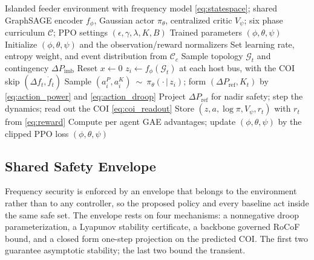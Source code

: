 \documentclass[lettersize,journal]{IEEEtran}
\begin{document}
	\begin{algorithm}[t]
		\caption{Topology-aware MAPPO training for FFR.}
		\label{alg:training}
		\begin{algorithmic}[1]
			\Require Islanded feeder environment with frequency model \eqref{eq:statespace}; shared GraphSAGE encoder $f_\phi$, Gaussian actor $\pi_\theta$, centralized critic $V_\psi$; six phase curriculum $\mathcal{C}$; PPO settings $(\epsilon,\gamma,\lambda,K,B)$
			\Ensure Trained parameters $(\phi,\theta,\psi)$
			\State Initialize $(\phi,\theta,\psi)$ and the observation/reward normalizers
			\State Set learning rate, entropy weight, and event distribution from $\mathcal{C}_c$
			\State Sample topology $\mathcal{G}_t$ and contingency $\Delta P_{\mathrm{imb}}$
			\State Reset $x\!\leftarrow\!0$
			\State $z_i \leftarrow f_\phi(\mathcal{G}_t)$ at each host bus, with the COI skip $(\Delta f_t,\dot f_t)$
			\State Sample $(a^P_i,a^K_i)~\sim~\pi_\theta(\cdot\,|\,z_i)$; form $(\Delta P_{\mathrm{ref}},K_t)$ by \eqref{eq:action_power} and \eqref{eq:action_droop}
			\State Project $\Delta P_{\mathrm{ref}}$ for nadir safety; step the dynamics; read out the COI \eqref{eq:coi_readout}
			\State Store $(z,a,\log\pi,V_\psi,r_t)$ with $r_t$ from \eqref{eq:reward}
			\EndFor
			\State Compute per agent GAE advantages; update $(\phi,\theta,\psi)$ by the clipped PPO loss
			\EndFor
			\EndFor
			\State \Return $(\phi,\theta,\psi)$
		\end{algorithmic}
	\end{algorithm}
	
	
	\subsection{Shared Safety Envelope}
	\label{sec:method:safety}
	
	Frequency security is enforced by an envelope that belongs to the environment rather than to any controller, so the proposed policy and every baseline act inside the same safe set. The envelope rests on four mechanisms: a nonnegative droop parameterization, a Lyapunov stability certificate, a backbone governed RoCoF bound, and a closed form one-step projection on the predicted COI. The first two guarantee asymptotic stability; the last two bound the transient.
	
\end{document}
